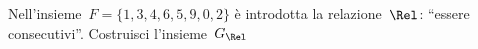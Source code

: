 \begin{esercizio}
\label{ese:B.6}
Nell'insieme~$F = \{ 1, 3, 4, 6, 5, 9, 0, 2 \}$ è introdotta la 
relazione~$\Rel$: ``essere consecutivi''. Costruisci l'insieme~$G_\Rel$
\end{esercizio}

%  
%  

